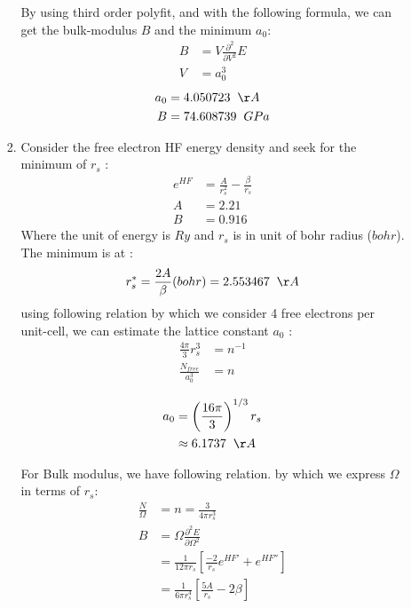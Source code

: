 \documentclass[notitlepage]{revtex4-1}
\begin{document}
\begin{CJK}{UTF8}{bsmi}
\begin{enumerate}
\begin{itemize}
\begin{enumerate}[label=(\arabic*)]
					By using third order polyfit, and with the following formula, we can get the bulk-modulus $B$ and the minimum $a_0$:
					\begin{align*}
					B &= V\frac{\partial^2}{\partial V^2} E \\
					V &= a_0^3
					\end{align*}
					\begin{align*}
					a_{0} &= 4.050723 \hspace{0.2cm} \AA\\
					B  &= 74.608739 \hspace{0.2cm} GPa
					\end{align*}
				
				\item  Consider the free electron HF energy density and seek for the minimum of $r_s$ :
				\begin{align*}
					e^{HF} &= \frac{A}{r_s^2} - \frac{\beta}{r_s} \\
					A &= 2.21 \\
					B &= 0.916
				\end{align*}
				Where the unit of energy is $Ry$ and $r_s$ is in unit of bohr radius ($bohr$). The minimum is at :
				\begin{equation*}
					r_s^{*} =\frac{2A}{\beta} (bohr)=  2.553467 \hspace{0.2cm} \AA 
				\end{equation*} 
				using following relation by which we consider 4 free electrons per unit-cell, we can estimate the lattice constant $a_0$ :
				\begin{align*}
					\frac{4\pi}{3}r_s^3 &= n^{-1} \\
					\frac{N_{free}}{a_0^3} &= n 
				\end{align*}
				
				\begin{align*}
					a_0 &= \left( \frac{16\pi}{3}\right)^{1/3} r_s \\
						&\approx 6.1737 \hspace{0.2cm} \AA \\
				\end{align*}
				
				For Bulk modulus, we have following relation. by which we express $\Omega$ in terms of $r_s$:
				\begin{align*}
					\frac{N}{\Omega} &= n = \frac{3}{4\pi r_s^3} \\
					B &= \Omega \frac{\partial^{2}E}{\partial \Omega^{2}} \\
					  &= \frac{1}{12\pi r_s}\left[ \frac{-2}{r_s}e^{HF'} + e^{HF''} \right] \\
					  &= \frac{1}{6\pi r_s^4} \left[ \frac{5A}{r_s} - 2\beta \right] \\
				\end{align*}


\end{enumerate}
\end{itemize}
\end{enumerate}
\end{CJK}
\end{document}
